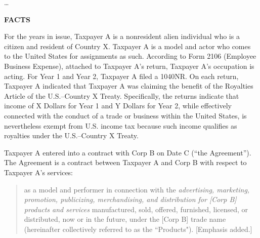 \begin{select}
\ldots\\
\begin{center} \textbf{FACTS}
\end{center}


For the years in issue, Taxpayer A is a nonresident alien individual who is a
citizen and resident of Country X. Taxpayer A is a model and actor who comes to
the United States for assignments as such. According to Form 2106 (Employee
Business Expense), attached to Taxpayer A's return, Taxpayer A's occupation is
acting. For Year 1 and Year 2, Taxpayer A filed a 1040NR. On each return,
Taxpayer A indicated that Taxpayer A was claiming the benefit of the Royalties
Article of the U.S.--Country X Treaty. Specifically, the returns indicate that income
of X Dollars for Year 1 and Y Dollars for Year 2, while effectively connected with the
conduct of a trade or business within the United States, is nevertheless exempt
from U.S. income tax because such income qualifies as royalties under the U.S.--Country X Treaty.

Taxpayer A entered into a contract with Corp B on Date C (“the Agreement”). 
The Agreement is a contract between Taxpayer A and Corp B with respect to
Taxpayer A's services:
\begin{quotation}
as a model and performer in connection with the \emph{advertising, marketing,
promotion, publicizing, merchandising, and distribution for [Corp B] products and services} manufactured, sold, offered, furnished, licensed, or distributed,
now or in the future, under the [Corp B] trade name (hereinafter collectively
referred to as the ``Products"). [Emphasis added.]
\end{quotation} 


\end{select}
